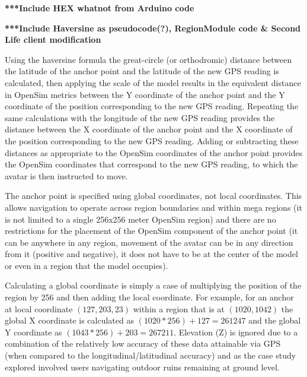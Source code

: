 \textbf{***Include HEX whatnot from Arduino code}

\textbf{***Include Haversine as pseudocode(?), RegionModule code \& Second Life client modification}








Using the haversine formula the great-circle (or orthodromic) distance between the latitude of the anchor point and the latitude of the new GPS reading is calculated, then applying the scale of the model results in the equivalent distance in OpenSim metrics between the Y coordinate of the anchor point and the Y coordinate of the position corresponding to the new GPS reading. Repeating the same calculations with the longitude of the new GPS reading provides the distance between the X coordinate of the anchor point and the X coordinate of the position corresponding to the new GPS reading. Adding or subtracting these distances as appropriate to the OpenSim coordinates of the anchor point provides the OpenSim coordinates that correspond to the new GPS reading, to which the avatar is then instructed to move.

The anchor point is specified using global coordinates, not local coordinates. This allows navigation to operate across region boundaries and within mega regions (it is not limited to a single 256x256 meter OpenSim region) and there are no restrictions for the placement of the OpenSim component of the anchor point (it can be anywhere in any region, movement of the avatar can be in any direction from it (positive and negative), it does not have to be at the center of the model or even in a region that the model occupies).

Calculating a global coordinate is simply a case of multiplying the position of the region by 256 and then adding the local coordinate. For example, for an anchor at local coordinate $(127,203,23)$ within a region that is at $(1020,1042)$ the global X coordinate is calculated as $(1020 * 256) + 127 = 261247$ and the global Y coordinate as $(1043 * 256) + 203 = 267211$. Elevation (Z) is ignored due to a combination of the relatively low accuracy of these data attainable via GPS (when compared to the longitudinal/latitudinal accuracy) and as the case study explored involved users navigating outdoor ruins remaining at ground level.


